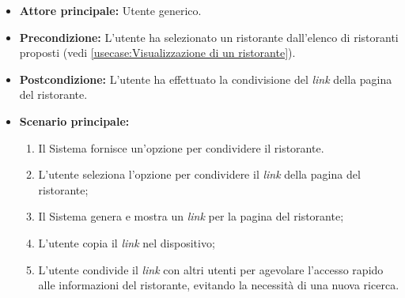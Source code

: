 \label{usecase:Condivisione link del ristorante}
\begin{itemize}
	\item \textbf{Attore principale:} Utente generico.


	\item \textbf{Precondizione:}
	      L'utente ha selezionato un ristorante dall'elenco di ristoranti
	      proposti (vedi \autoref{usecase:Visualizzazione di un ristorante}).

	\item \textbf{Postcondizione:}
	      L'utente ha effettuato la condivisione del \textit{link} della pagina del ristorante.

	\item \textbf{Scenario principale:}
	      \begin{enumerate}
		      \item Il Sistema fornisce un'opzione per condividere il ristorante.
		      \item L'utente seleziona l'opzione per condividere il \textit{link} della pagina del ristorante;
		      \item Il Sistema genera e mostra un \textit{link} per la pagina del ristorante;
		      \item L'utente copia il \textit{link} nel dispositivo;
		      \item L'utente condivide il \textit{link} con altri utenti per agevolare l'accesso rapido alle
		            informazioni del ristorante, evitando la necessità di una nuova ricerca.
	      \end{enumerate}
\end{itemize}

